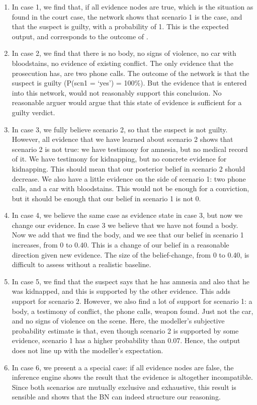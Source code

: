 \documentclass[12pt]{article}
\begin{document}
\begin{enumerate}
\item In case 1, we find that, if all evidence nodes are true, which is the situation as found in the court case, the network shows that scenario 1 is the case, and that the suspect is guilty, with a probability of 1. This is the expected output, and corresponds to the outcome of \citet{vanLeeuwen2019}.
\item In case 2, we find that there is no body, no signs of violence, no car with bloodstains, no evidence of existing conflict. The only evidence that the prosecution has, are two phone calls. The outcome of the network is that the suspect is guilty (P(scn1 = `yes') = 100\%). But the evidence that is entered into this network, would not reasonably support this conclusion. No reasonable arguer would argue that this state of evidence is sufficient for a guilty verdict.
\item In case 3, we fully believe scenario 2, so that the suspect is not guilty. However, all evidence that we have learned about scenario 2 shows that scenario 2 is not true: we have testimony for amnesia, but no medical record of it. We have testimony for kidnapping, but no concrete evidence for kidnapping. This should mean that our posterior belief in scenario 2 should decrease. We also have a little evidence on the side of scenario 1: two phone calls, and a car with bloodstains. This would not be enough for a conviction, but it should be enough that our belief in scenario 1 is not 0.
\item In case 4, we believe the same case as evidence state in case 3, but now we change our evidence. In case 3 we believe that we have not found a body. Now we add that we find the body, and we see that our belief in scenario 1 increases, from 0 to 0.40. This is a change of our belief in a reasonable direction given new evidence. The size of the belief-change, from 0 to 0.40, is difficult to assess without a realistic baseline.
\item In case 5, we find that the suspect says that he has amnesia and also that he was kidnapped, and this is supported by the other evidence. This adds support for scenario 2. However, we also find a lot of support for scenario 1: a body, a testimony of conflict, the phone calls, weapon found. Just not the car, and no signs of violence on the scene. Here, the modeller's subjective probability estimate is that, even though scenario 2 is supported by some evidence, scenario 1 has a higher probability than 0.07. Hence, the output does not line up with the modeller's expectation.
\item In case 6, we present a a special case: if all evidence nodes are false, the inference engine shows the result that the evidence is altogether incompatible. Since both scenarios are mutually exclusive and exhaustive, this result is sensible and shows that the BN can indeed structure our reasoning.
\end{enumerate}
\end{document}
